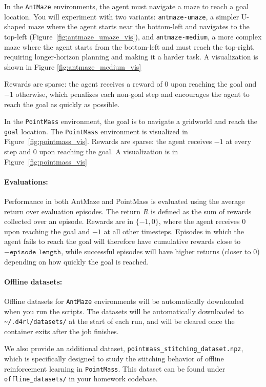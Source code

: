 \documentclass[12pt]{article}
\begin{document}
In the \texttt{AntMaze} environments, the agent must navigate a maze to reach a goal location. You will experiment with two variants: \texttt{antmaze-umaze}, a simpler U-shaped maze where the agent starts near the bottom-left and navigates to the top-left (Figure~\ref{fig:antmaze_umaze_vis}), and \texttt{antmaze-medium}, a more complex maze where the agent starts from the bottom-left and must reach the top-right, requiring longer-horizon planning and making it a harder task. A visualization is shown in Figure \ref{fig:antmaze_medium_vis}

Rewards are sparse: the agent receives a reward of $0$ upon reaching the goal and $-1$ otherwise, which penalizes each non-goal step and encourages the agent to reach the goal as quickly as possible.

 In the \texttt{PointMass} environment, the goal is to navigate a gridworld and reach the \texttt{goal} location. The \texttt{PointMass} environment is visualized in Figure~\ref{fig:pointmass_vis}. Rewards are sparse: the agent receives $-1$ at every step and $0$ upon reaching the goal. A visualization is in Figure~\ref{fig:pointmass_vis}
 

\paragraph{Evaluations:} 

Performance in both AntMaze and PointMass is evaluated using the average return over evaluation episodes. The return \(R\) is defined as the sum of rewards collected over an episode. Rewards are in \(\{-1, 0\}\), where the agent receives \(0\) upon reaching the goal and \(-1\) at all other timesteps.
Episodes in which the agent fails to reach the goal will therefore have cumulative rewards close to \(-\texttt{episode\_length}\), while successful episodes will have higher returns (closer to \(0\)) depending on how quickly the goal is reached.


\paragraph{Offline datasets: } Offline datasets for \texttt{AntMaze} environments will be automatically downloaded when you run the scripts. The datasets will be automatically downloaded to \\
\verb|~/.d4rl/datasets/| at the start of each run, and will be cleared once the container exits after the job finishes.

We also provide an additional dataset, \texttt{pointmass\_stitching\_dataset.npz}, which is specifically designed to study the stitching behavior of offline reinforcement learning in \texttt{PointMass}. This dataset can be found under \texttt{offline\_datasets/} in your homework codebase.
\end{document}
